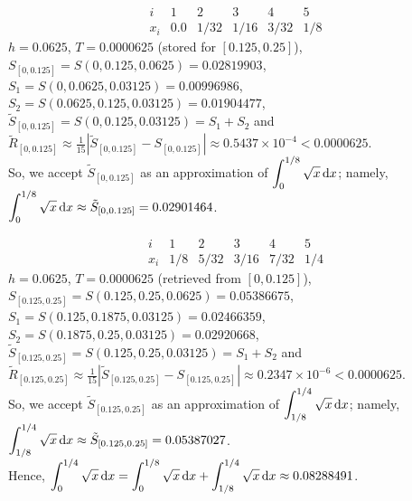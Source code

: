 \begin{egg}
\[
\begin{array}{c|ccccc}
i & 1 & 2 & 3 & 4 & 5 \\
\hline
x_i & 0.0 & 1/32 & 1/16 & 3/32 & 1/8
\end{array}
\]
$h=0.0625$, $T=0.0000625$ (stored for $[0.125,0.25]$),\\
$S_{[0,0.125]} = S(0,0.125, 0.0625) = 0.02819903$,\\
$S_1 = S(0,0.0625, 0.03125) = 0.00996986$,
$S_2 = S(0.0625, 0.125, 0.03125) = 0.01904477$,\\
$\tilde{S}_{[0,0.125]} = S(0,0.125,0.03125) = S_1+S_2$ and\\
$\displaystyle \tilde{R}_{[0,0.125]} \approx \frac{1}{15}\left|
\tilde{S}_{[0,0.125]} - S_{[0,0.125]}\right|
\approx 0.5437 \times 10^{-4} < 0.0000625$.\\
So, we accept $\tilde{S}_{[0,0.125]}$ as an approximation of
$\displaystyle \int_0^{1/8} \sqrt{x}\,\mathrm{d}x$; namely,\\
$\displaystyle \int_0^{1/8} \sqrt{x}\,\mathrm{d}x \approx
\tilde{S}_{[0,0.125]} = 0.02901464$.

\[
\begin{array}{c|ccccc}
i & 1 & 2 & 3 & 4 & 5 \\
\hline
x_i & 1/8 & 5/32 & 3/16 & 7/32 & 1/4
\end{array}
\]
$h=0.0625$, $T=0.0000625$ (retrieved from $[0, 0.125]$),\\
$S_{[0.125,0.25]} = S(0.125, 0.25, 0.0625) = 0.05386675$,\\
$S_1 = S(0.125, 0.1875, 0.03125) = 0.02466359$,
$S_2 = S(0.1875, 0.25, 0.03125) = 0.02920668$,\\
$\tilde{S}_{[0.125,0.25]} = S(0.125,0.25,0.03125) = S_1+S_2$
and\\
$\displaystyle \tilde{R}_{[0.125,0.25]} \approx \frac{1}{15}\left|
  \tilde{S}_{[0.125,0.25]} - S_{[0.125,0.25]}\right|
\approx 0.2347 \times 10^{-6} < 0.0000625$.\\
So, we accept $\tilde{S}_{[0.125,0.25]}$ as an approximation of
$\displaystyle \int_{1/8}^{1/4} \sqrt{x}\,\mathrm{d}x$; namely,\\
$\displaystyle \int_{1/8}^{1/4} \sqrt{x}\,\mathrm{d}x \approx \tilde{S}_{[0.125,0.25]}
= 0.05387027$.\\
Hence,
$\displaystyle \int_0^{1/4} \sqrt{x}\,\mathrm{d}x =
\int_0^{1/8} \sqrt{x}\,\mathrm{d}x + \int_{1/8}^{1/4} \sqrt{x}\,\mathrm{d}x \approx
0.08288491$.


\end{egg}
